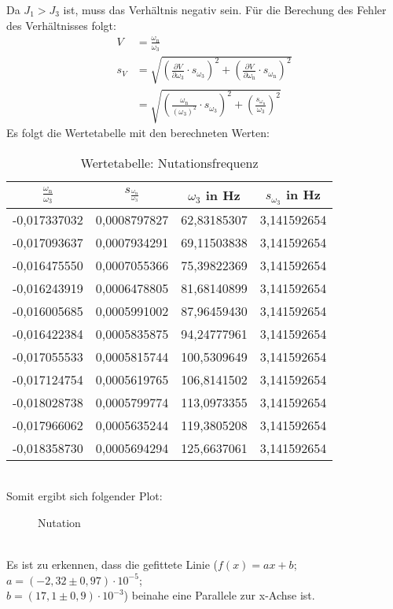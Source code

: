 Da \(J_1>J_3\) ist, muss das Verhältnis negativ sein.
Für die Berechung des Fehler des Verhältnisses folgt:
\begin{align*}
    V&=\frac{\omega_\text{n}}{\omega_3}\\
    s_{V}&=\sqrt{\left(\frac{\partial V}{\partial \omega_3}\cdot s_{\omega_3}\right)^2+\left(\frac{\partial V}{\partial \omega_\text{n}}\cdot s_{\omega_\text{n}}\right)^2}\\
    &=\sqrt{\left(\frac{\omega_\text{n}}{\left(\omega_3\right)^2}\cdot s_{\omega_3}\right)^2+\left(\frac{s_{\omega_\text{n}}}{\omega_3}\right)^2}
\end{align*}\newpage
Es folgt die Wertetabelle mit den berechneten Werten:
\begin{table}[ht]
    \centering\begin{tabular}{c|c|c|c}
      $\frac{\omega_\text{n}}{\omega_3}$ & $s_{\frac{\omega_\text{n}}{\omega_3}}$ & $\omega_3$ in Hz & $s_{\omega_3}$ in Hz\\
      \hline
      -0,017337032&0,0008797827&62,83185307&3,141592654\\
        -0,017093637&0,0007934291&69,11503838&3,141592654\\
        -0,016475550&0,0007055366&75,39822369&3,141592654\\
        -0,016243919&0,0006478805&81,68140899&3,141592654\\
        -0,016005685&0,0005991002&87,96459430&3,141592654\\
        -0,016422384&0,0005835875&94,24777961&3,141592654\\
        -0,017055533&0,0005815744&100,5309649&3,141592654\\
        -0,017124754&0,0005619765&106,8141502&3,141592654\\
        -0,018028738&0,0005799774&113,0973355&3,141592654\\
        -0,017966062&0,0005635244&119,3805208&3,141592654\\
        -0,018358730&0,0005694294&125,6637061&3,141592654
    \end{tabular}
    \caption{Wertetabelle: Nutationsfrequenz}
\end{table}\\
Somit ergibt sich folgender Plot:
\begin{figure}[h]
    \centering\scalebox{0.85}{}
    \caption{Nutation}
\end{figure}\\
Es ist zu erkennen, dass die gefittete Linie ($f(x)=ax+b$; $a=\left(-2,32\pm0,97\right)\cdot10^{-5}$;\\$b=\left(17,1\pm0,9\right)\cdot10^{-3}$) beinahe eine Parallele zur x-Achse ist.
